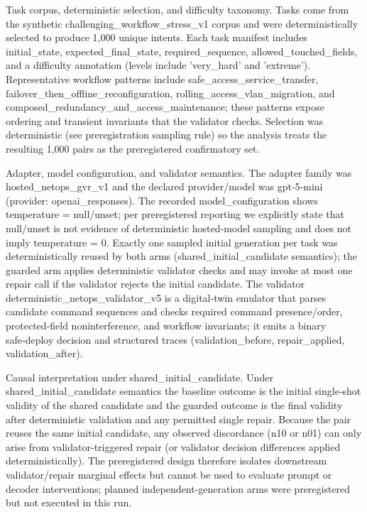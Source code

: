\documentclass[conference]{IEEEtran}
\begin{document}
Task corpus, deterministic selection, and difficulty taxonomy. Tasks come from the synthetic challenging\_workflow\_stress\_v1 corpus and were deterministically selected to produce 1,000 unique intents. Each task manifest includes initial\_state, expected\_final\_state, required\_sequence, allowed\_touched\_fields, and a difficulty annotation (levels include 'very\_hard' and 'extreme'). Representative workflow patterns include safe\_access\_service\_transfer, failover\_then\_offline\_reconfiguration, rolling\_access\_vlan\_migration, and composed\_redundancy\_and\_access\_maintenance; these patterns expose ordering and transient invariants that the validator checks. Selection was deterministic (see preregistration sampling rule) so the analysis treats the resulting 1,000 pairs as the preregistered confirmatory set.

Adapter, model configuration, and validator semantics. The adapter family was hosted\_netops\_gvr\_v1 and the declared provider/model was gpt‑5‑mini (provider: openai\_responses). The recorded model\_configuration shows temperature = null/unset; per preregistered reporting we explicitly state that null/unset is not evidence of deterministic hosted‑model sampling and does not imply temperature = 0. Exactly one sampled initial generation per task was deterministically reused by both arms (shared\_initial\_candidate semantics); the guarded arm applies deterministic validator checks and may invoke at most one repair call if the validator rejects the initial candidate. The validator deterministic\_netops\_validator\_v5 is a digital‑twin emulator that parses candidate command sequences and checks required command presence/order, protected‑field noninterference, and workflow invariants; it emits a binary safe‑deploy decision and structured traces (validation\_before, repair\_applied, validation\_after).

Causal interpretation under shared\_initial\_candidate. Under shared\_initial\_candidate semantics the baseline outcome is the initial single‑shot validity of the shared candidate and the guarded outcome is the final validity after deterministic validation and any permitted single repair. Because the pair reuses the same initial candidate, any observed discordance (n10 or n01) can only arise from validator-triggered repair (or validator decision differences applied deterministically). The preregistered design therefore isolates downstream validator/repair marginal effects but cannot be used to evaluate prompt or decoder interventions; planned independent-generation arms were preregistered but not executed in this run.
\end{document}
